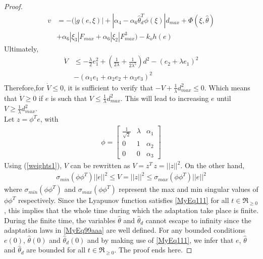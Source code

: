 \documentclass[10pt,a4paper]{amsart}
\begin{document}
\begin{proof}
\begin{equation} \label{MyEq110}
  \begin{split}
  v&=-(|g(e,\xi)|+|\alpha_4-\alpha_6{\hat \theta}^T_d\phi(\xi)|d_{max}+\Phi(\xi,\hat \theta)\\
  &+\alpha_6|\xi_3|F_{max}+\alpha_6|\xi_2|F^3_{max})-k_oh(e)
  \end{split}
\end{equation}
Ultimately,
\begin{equation} \label{MyEq111}
  \begin{split}
{\dot V}  &\leq -\tfrac{\lambda}{2} e_1^2+ (\tfrac{1}{2\lambda}+\tfrac{1}{2\lambda^5})d^2-(e_2+ \lambda e_1)^2\\
&-(\alpha_1 e_1 + \alpha_2 e_2 + \alpha_3 e_3)^2
  \end{split}
\end{equation}
Therefore,for ${\dot V} \leq 0$, it is sufficient to verify that $-V  +\tfrac{1}{\lambda}d_{max}^2 \leq 0$. Which means that ${\dot V} \geq 0$ if $e$ is such that $V \leq \tfrac{1}{\lambda}d_{max}^2$. This will lead to increasing $e$ until $V \geq \tfrac{1}{\lambda}d_{max}^2$.\\
Let $z=\phi^T e$, with
\begin{equation} \label{weights1}
  \begin{split}
\phi = \left[ \begin{array}{lll} \frac{1}{\sqrt{2}}&\lambda&\alpha_1\\ 0 & 1 & \alpha_2\\ 0& 0&\alpha_3 \end{array}\right]
\end{split}
\end{equation}
Using (\ref{weights1}), $V$ can be rewritten as $V=z^T\,z=||z||^2$. On the other hand,
\begin{equation} \label{weights2}
  \begin{split}
\sigma_{min}(\phi \phi^T)||e||^2\leq V=||z||^2 \leq \sigma_{max}(\phi \phi^T)||e||^2
\end{split}
\end{equation}
where $\sigma_{min}(\phi \phi^T)$ and $\sigma_{max}(\phi \phi^T)$ represent the max and min singular values of $\phi \phi^T$ respectively.
Since the Lyapunov function satisfies \eqref{MyEq111} for all $t \in \Re_{\geq0}$, this implies that the whole time during which the adaptation take place is finite. During the finite time, the variables $\hat \theta$ and ${\hat \theta}_d$ cannot escape to infinity since the adaptation laws in \eqref{MyEq99aaa} are well defined. For any bounded conditions $e(0)$, ${\hat \theta}(0)$ and ${\hat \theta}_d(0)$ and by making use of \eqref{MyEq111}, we infer that $e$, ${\hat \theta}$ and ${\hat \theta}_d$ are bounded for all $t \in \Re_{\geq0}$. The proof ends here.
\end{proof}
\end{document}
